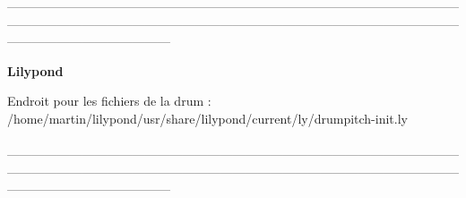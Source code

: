 —————————————————————————————————————————————————————————————————————————————————————\\
\begin{center}
	\textbf{\LARGE{Lilypond}}
\end{center}
Endroit pour les fichiers de la drum :\\
/home/martin/lilypond/usr/share/lilypond/current/ly/drumpitch-init.ly\\\\
—————————————————————————————————————————————————————————————————————————————————————\\\\
